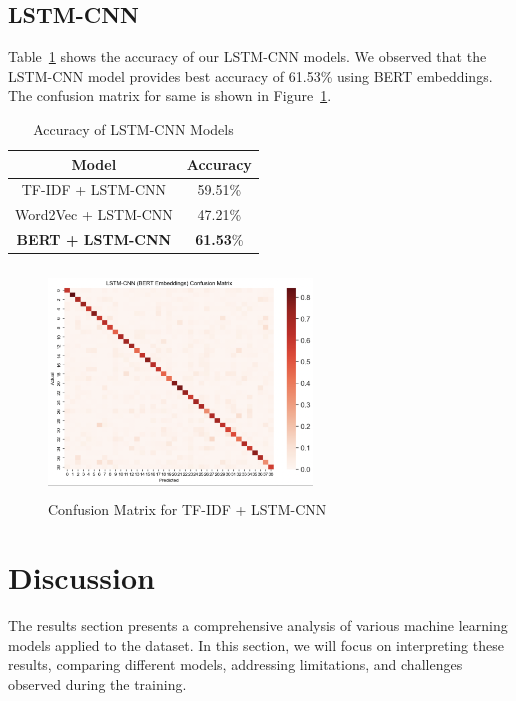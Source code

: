 \documentclass[conference]{IEEEtran}
\begin{document}
\subsection{LSTM-CNN}

Table~\ref{tab: lstm_cnn_models} shows the accuracy of our LSTM-CNN models. We observed that the LSTM-CNN model provides best accuracy of 61.53\% using BERT embeddings. The confusion matrix for same is shown in Figure~\ref{fig:lstm_cnn}.

\begin{table}[!htb]
\centering
\caption{Accuracy of LSTM-CNN Models}
\label{tab: lstm_cnn_models}
\begin{tabular}{c|c}\midrule\midrule
Model & Accuracy\\ \midrule
TF-IDF + LSTM-CNN & 59.51\% \\
Word2Vec + LSTM-CNN & 47.21\% \\
\textbf{BERT + LSTM-CNN} & \textbf{61.53}\% \\ \midrule\midrule
\end{tabular}
\end{table}

\begin{figure}[!htb]
\centering
\includegraphics[width=70mm, height = 60mm]{Images/LSTM-CNN.png}
\caption{Confusion Matrix for TF-IDF + LSTM-CNN}\label{fig:lstm_cnn}
\end{figure}

\section{Discussion}

The results section presents a comprehensive analysis of various machine learning models applied to the dataset. In this section, we will focus on interpreting these results, comparing different models, addressing limitations, and challenges observed during the training.
\end{document}
